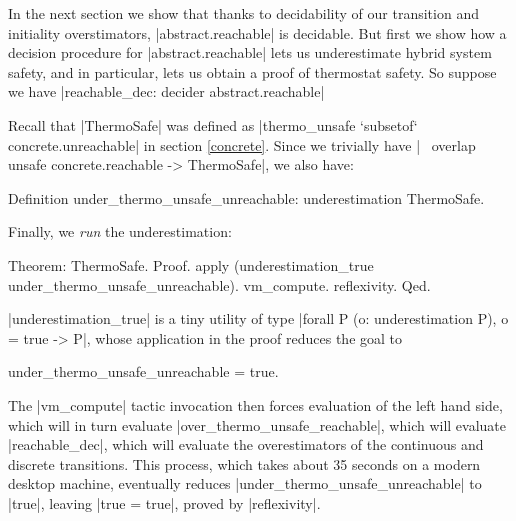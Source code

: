 \documentclass[runningheads]{llncs}
\newcommand{\weg}[1]{}
\begin{document}
In the next section we show that thanks to decidability of our
transition and initiality overstimators, |abstract.reachable| is
decidable. But first we show how a
decision procedure for |abstract.reachable| lets us underestimate
hybrid system safety, and in particular, lets us obtain a proof of
thermostat safety. So suppose we have |reachable_dec: decider abstract.reachable|
\weg{
And suppose we are given the following specification of unsafe concrete states, covered by a finite list of abstract states:
\begin{code}
  Variables
    (unsafe: concrete.State -> Prop)
    (astates: list abstract.State)
    (astates_cover_unsafe: forall s, unsafe s -> forall r, s `elem` r -> r `elem` astates).
\end{code}

Then, using |reachable_dec| and |unreachable_respect|, we can easily define
\begin{code}
  Definition over_unsafe_reachable: overestimation (overlap unsafe concrete.reachable).
\end{code}
Taking |unsafe := thermo_unsafe| and a suitable abstract cover, we obtain
\begin{code}
  Definition over_thermo_unsafe_reachable:
    overestimation (overlap thermo_unsafe concrete.reachable).
\end{code}
}
Recall that |ThermoSafe| was defined as |thermo_unsafe `subsetof` concrete.unreachable| in section \ref{concrete}. Since we trivially have |~ overlap unsafe concrete.reachable -> ThermoSafe|, we also have:
\begin{code}
Definition under_thermo_unsafe_unreachable: underestimation ThermoSafe.
\end{code}
Finally, we \emph{run} the underestimation:
\begin{code}
Theorem: ThermoSafe.
Proof.
  apply (underestimation_true under_thermo_unsafe_unreachable).
  vm_compute.  reflexivity.
Qed.
\end{code}
|underestimation_true| is a tiny utility of type |forall P (o: underestimation P), o = true -> P|, whose application in the proof reduces the goal to
\begin{code}under_thermo_unsafe_unreachable = true.\end{code} The |vm_compute| tactic invocation then forces evaluation of the left hand side, which will in turn evaluate |over_thermo_unsafe_reachable|, which will evaluate |reachable_dec|, which will evaluate the overestimators of the continuous and discrete transitions. This process, which takes about 35 seconds on a modern desktop machine, eventually reduces |under_thermo_unsafe_unreachable| to |true|, leaving |true = true|, proved by |reflexivity|.
\end{document}
